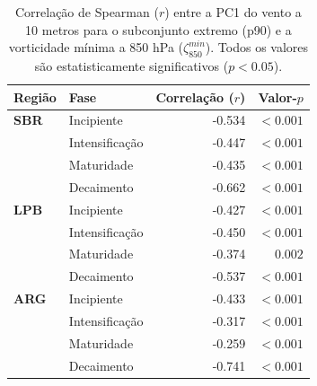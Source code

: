 \begin{table}[htbp]
\centering
\caption[Correlação entre PC1 e vorticidade --- Subconjunto p90]{Correlação de Spearman ($r$) entre a PC1 do vento a 10 metros para o subconjunto extremo (p90) e a vorticidade mínima a 850 hPa ($\zeta_{850}^{min}$). Todos os valores são estatisticamente significativos ($p < 0.05$).}
\label{tab:corr_p90_w10}
\begin{tabular*}{\textwidth}{@{\extracolsep{\fill}}llrr}
\hline
\textbf{Região} & \textbf{Fase} & \textbf{Correlação ($r$)} & \textbf{Valor-$p$} \\
\hline
\textbf{SBR} & Incipiente & -0.534 & $<0.001$ \\
 & Intensificação & -0.447 & $<0.001$ \\
 & Maturidade & -0.435 & $<0.001$ \\
 & Decaimento & -0.662 & $<0.001$ \\
\hline
\textbf{LPB} & Incipiente & -0.427 & $<0.001$ \\
 & Intensificação & -0.450 & $<0.001$ \\
 & Maturidade & -0.374 & $0.002$ \\
 & Decaimento & -0.537 & $<0.001$ \\
\hline
\textbf{ARG} & Incipiente & -0.433 & $<0.001$ \\
 & Intensificação & -0.317 & $<0.001$ \\
 & Maturidade & -0.259 & $<0.001$ \\
 & Decaimento & -0.741 & $<0.001$ \\
\hline
\end{tabular*}
\end{table}
